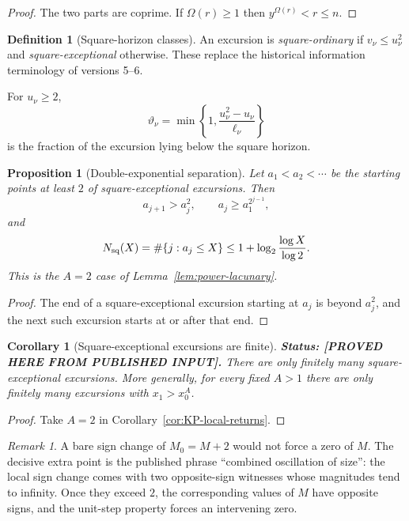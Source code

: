 \documentclass[11pt]{amsart}
\numberwithin{equation}{section}
\theoremstyle{plain}
\newtheorem{proposition}[theorem]{Proposition}
\newtheorem{corollary}[theorem]{Corollary}
\theoremstyle{definition}
\newtheorem{definition}[theorem]{Definition}
\theoremstyle{remark}
\newtheorem{remark}[theorem]{Remark}
\begin{document}
\begin{proof}
The two parts are coprime. If $\Omega(r)\ge1$ then $y^{\Omega(r)}<r\le n$.
\end{proof}

\begin{definition}[Square-horizon classes]
\label{def:info-excursion}
An excursion is \emph{square-ordinary} if $v_\nu\le u_\nu^2$ and
\emph{square-exceptional} otherwise. These replace the historical information terminology of versions 5--6.\par
For $u_\nu\ge2$,
\[
\vartheta_\nu=\min\left\{1,\frac{u_\nu^2-u_\nu}{\ell_\nu}\right\}
\]
is the fraction of the excursion lying below the square horizon.
\end{definition}

\begin{proposition}[Double-exponential separation]
\label{prop:double-exp}
Let $a_1<a_2<\cdots$ be the starting points at least $2$ of
square-exceptional excursions. Then
\[
a_{j+1}>a_j^2,\qquad a_j\ge a_1^{2^{j-1}},
\]
and
\[
N_{\rm sq}(X)=\#\{j:a_j\le X\}
\le1+\log_2\frac{\log X}{\log2}.
\]
This is the $A=2$ case of Lemma~\ref{lem:power-lacunary}.
\end{proposition}

\begin{proof}
The end of a square-exceptional excursion starting at $a_j$ is beyond
$a_j^2$, and the next such excursion starts at or after that end.
\end{proof}

\begin{corollary}[Square-exceptional excursions are finite]
\label{cor:finiteness_expanding}
\textbf{Status: [PROVED HERE FROM PUBLISHED INPUT].} There are only finitely
many square-exceptional excursions. More generally, for every fixed $A>1$
there are only finitely many excursions with $x_1>x_0^A$.
\end{corollary}

\begin{proof}
Take $A=2$ in Corollary~\ref{cor:KP-local-returns}.
\end{proof}

\begin{remark}
A bare sign change of $M_0=M+2$ would not force a zero of $M$. The decisive
extra point is the published phrase ``combined oscillation of size'': the
local sign change comes with two opposite-sign witnesses whose magnitudes
tend to infinity. Once they exceed $2$, the corresponding values of $M$
have opposite signs, and the unit-step property forces an intervening zero.
\end{remark}
\end{document}
